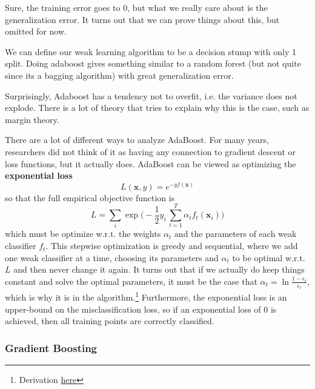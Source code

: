 \documentclass{article}
\begin{document}
        Sure, the training error goes to $0$, but what we really care about is the generalization error. It turns out that we can prove things about this, but omitted for now. 

        \begin{example}
          We can define our weak learning algorithm to be a decision stump with only 1 split. Doing adaboost gives something similar to a random forest (but not quite since its a bagging algorithm) with great generalization error. 
        \end{example}

        Surprisingly, Adaboost has a tendency not to overfit, i.e. the variance does not explode. There is a lot of theory that tries to explain why this is the case, such as margin theory. 

        There are a lot of different ways to analyze AdaBoost. For many years, researchers did not think of it as having any connection to gradient descent or loss functions, but it actually does. AdaBoost can be viewed as optimizing the \textbf{exponential loss} 
        \begin{equation}
          L(\mathbf{x}, y) = e^{-y f(\mathbf{x})} 
        \end{equation}
        so that the full empirical objective function is 
        \begin{equation}
          L = \sum_i \exp \bigg( -\frac{1}{2} y_i \, \sum_{t=1}^T \alpha_t f_t (\mathbf{x}_i)\bigg)
        \end{equation}
        which must be optimize w.r.t. the weights $\alpha_t$ and the parameters of each weak classifier $f_t$. This stepwise optimization is greedy and sequential, where we add one weak classifier at a time, choosing its parameters and $\alpha_t$ to be optimal w.r.t. $L$ and then never change it again. It turns out that if we actually do keep things constant and solve the optimal parameters, it must be the case that $\alpha_t = \ln \frac{1 - \epsilon_t}{\epsilon_t}$, which is why it is in the algorithm.\footnote{Derivation \href{https://www.cs.toronto.edu/~mbrubake/teaching/C11/Handouts/AdaBoost.pdf}{here}} Furthermore, the exponential loss is an upper-bound on the misclassification loss, so if an exponential loss of $0$ is achieved, then all training points are correctly classified. 

      \subsubsection{Gradient Boosting}
\end{document}

